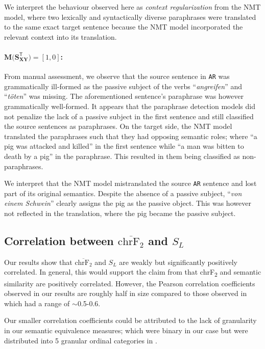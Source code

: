 \documentclass[11pt,a4paper]{article}
\begin{document}
We interpret the behaviour observed here as \textit{context regularization} from the NMT model, where two lexically and syntactically diverse paraphrases were translated to the same exact target sentence because the NMT model incorporated the relevant context into its translation.

\paragraph{$\mathbf{M(S_{XY}^{\mathsf{T}}}) = [1,0]$:} From manual assessment, we observe that the source sentence in \texttt{AR} was grammatically ill-formed as the passive subject of the verbs ``\textit{angreifen}'' and ``\textit{töten}'' was missing. The aforementioned sentence's paraphrase was however grammatically well-formed. It appears that the paraphrase detection models did not penalize the lack of a passive subject in the first sentence and still classified the source sentences as paraphrases. On the target side, the NMT model translated the paraphrases such that they had opposing semantic roles; where ``a pig was attacked and killed'' in the first sentence while ``a man was bitten to death by a pig'' in the paraphrase. This resulted in them being classified as non-paraphrases.

We interpret that the NMT model mistranslated the source \texttt{AR} sentence and lost part of its original semantics. Despite the absence of a passive subject, ``\textit{von einem Schwein}'' clearly assigns the pig as the passive object. This was however not reflected in the translation, where the pig became the passive subject.

\subsection{Correlation between $\overline{\text{chrF}_2}$ and $S_L$}

Our results show that $\overline{\text{chrF}_2}$ and $S_L$ are weakly but significantly positively correlated. In general, this would support the claim from \citet{michel2019evaluation} that chrF\textsubscript{2} and semantic similarity are positively correlated. However, the Pearson correlation coefficients observed in our results are roughly half in size compared to those observed in \citet{michel2019evaluation} which had a range of $\sim$0.5-0.6.

Our smaller correlation coefficients could be attributed to the lack of granularity in our semantic equivalence measures; which were binary in our case but were distributed into 5 granular ordinal categories in \citet{michel2019evaluation}. 
\end{document}
